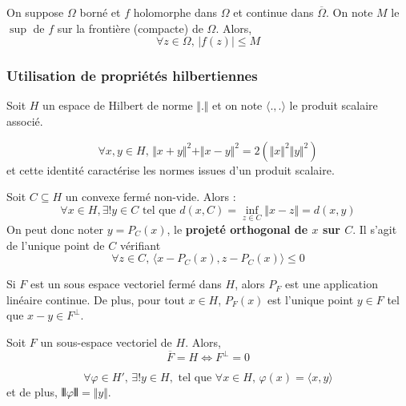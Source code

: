   \begin{theorem}
    On suppose $\Omega$ borné et $f$ holomorphe dans $\Omega$ et continue dans $\overline{\Omega}$. On note $M$ le $\sup$ de $f$ sur la frontière (compacte) de $\Omega$. Alors,
    \[ \forall z \in \Omega, \, \vert f(z) \vert \leq M \]
  \end{theorem}

  \subsubsection{Utilisation de propriétés hilbertiennes}


  Soit $H$ un espace de Hilbert de norme $\Vert . \Vert$ et on note $\langle ., . \rangle$ le produit scalaire associé.

  \begin{lemma}
    \[ \forall x, y \in H, \, \Vert x + y \Vert^2 + \Vert x - y \Vert^2 = 2(\Vert x \Vert^2 \Vert y \Vert^2) \]
    et cette identité caractérise les normes issues d'un produit scalaire.
  \end{lemma}


  \begin{theorem}
    Soit $C \subseteq H$ un convexe fermé non-vide. Alors :
    \[ \forall x \in H, \exists! y \in C \text{ tel que } d(x, C) = \inf_{z \in C} \Vert x - z \Vert = d(x, y) \]
    On peut donc noter $y = P_C(x)$, le \textbf{projeté orthogonal de $x$ sur $C$}. Il s'agit de l'unique point de $C$ vérifiant
    \[ \forall z \in C, \, \langle x - P_C(x), z - P_C(x) \rangle \leq 0 \]
  \end{theorem}

  \begin{theorem}
    Si $F$ est un sous espace vectoriel fermé dans $H$, alors $P_F$ est une application linéaire continue. De plus, pour tout $x \in H$, $P_F(x)$ est l'unique point $y \in F$ tel que $x-y \in F^\perp$.
  \end{theorem}

  \begin{application}
    Soit $F$ un sous-espace vectoriel de $H$. Alors,
    \[ \overline{F} = H \iff F^\perp = 0 \]
  \end{application}

  \begin{application}
    \[ \forall \varphi \in H', \, \exists! y \in H, \text{ tel que } \forall x \in H, \, \varphi(x) = \langle x, y \rangle \]
    et de plus, $\VERT \varphi \VERT = \Vert y \Vert$.
  \end{application}

